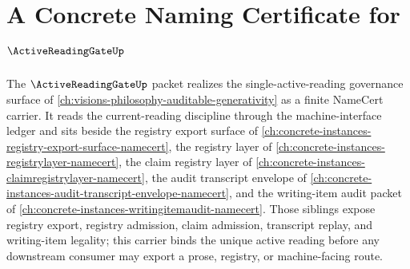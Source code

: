 \chapter{A Concrete Naming Certificate for $\ActiveReadingGateUp$}
\label{ch:concrete-instances-active-reading-gate-namecert}

The $\ActiveReadingGateUp$ packet realizes the single-active-reading governance surface of \autoref{ch:visions-philosophy-auditable-generativity} as a finite NameCert carrier. It reads the current-reading discipline through the machine-interface ledger and sits beside the registry export surface of \autoref{ch:concrete-instances-registry-export-surface-namecert}, the registry layer of \autoref{ch:concrete-instances-registrylayer-namecert}, the claim registry layer of \autoref{ch:concrete-instances-claimregistrylayer-namecert}, the audit transcript envelope of \autoref{ch:concrete-instances-audit-transcript-envelope-namecert}, and the writing-item audit packet of \autoref{ch:concrete-instances-writingitemaudit-namecert}. Those siblings expose registry export, registry admission, claim admission, transcript replay, and writing-item legality; this carrier binds the unique active reading before any downstream consumer may export a prose, registry, or machine-facing route.

